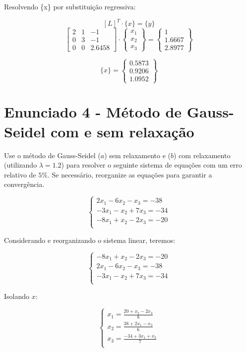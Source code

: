 \documentclass[12pt]{article}
\begin{document}
Resolvendo \{x\} por substituição regressiva:

\[
[L]^T \cdot \{x\} = \{y\}
\]
\[
\begin{bmatrix}
2 & 1 & -1 \\
0 & 3 & -1 \\
0 & 0 & 2.6458
\end{bmatrix} \cdot
\begin{Bmatrix}
x_1 \\
x_2 \\
x_3
\end{Bmatrix} =
\begin{Bmatrix}
  1 \\
  1.6667 \\
  2.8977
\end{Bmatrix}
\]

\[
\{x\} = \begin{Bmatrix}
  0.5873 \\
  0.9206 \\
  1.0952
\end{Bmatrix}
\]

\newpage
\section{Enunciado 4 - Método de Gauss-Seidel com e sem relaxação}
Use o método de Gauss-Seidel ($a$) sem relaxamento e ($b$) com relaxamento (utilizando $\lambda = 1.2$)
para resolver o seguinte sistema de equações com um erro relativo de $5\%$. Se necessário,
reorganize as equações para garantir a convergência.

\[
\begin{cases}
2x_1 - 6x_2 - x_3 = -38 \\
- 3x_1 - x_2 + 7x_3 = -34 \\
-8x_1 + x_2 - 2x_3 = -20 \\
\end{cases}
\]

Considerando e reorganizando o sistema linear, teremos:

\[
\begin{cases}
-8x_1 + x_2 - 2x_3 = -20 \\
2x_1 - 6x_2 - x_3 = -38 \\
- 3x_1 - x_2 + 7x_3 = -34 \\
\end{cases}
\]

Isolando \(x\):

\[
\begin{cases}
x_1 = \frac{20 + x_2 -2x_3}{8} \\
x_2 = \frac{38 + 2x_1 - x_3}{6} \\
x_3 = \frac{-34 + 3x_1 + x_2}{7} \\
\end{cases}
\]
\end{document}
